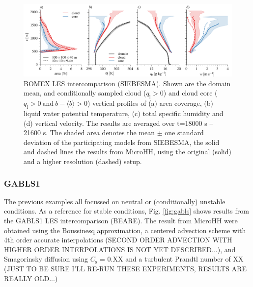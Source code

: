 \documentclass[gmd]{copernicus}
\begin{document}
\begin{figure}[t]
\vspace*{2mm}
\begin{center}
\includegraphics[width=16.6cm]{figs/gmd_bomex_profs.pdf}
\end{center}
\caption{BOMEX LES intercomparison (SIEBESMA). Shown are the domain mean, and conditionally sampled cloud ($q_\mathrm{l} > 0$) and cloud core ($q_\mathrm{l}>0 \ \mathrm{and} \ b-\langle b \rangle > 0$) vertical profiles of (a) area coverage, (b) liquid water potential temperature, (c) total specific humidity and (d) vertical velocity. The results are averaged over t=18000 s -- 21600 s. The shaded area denotes the mean $\pm$ one standard deviation of the participating models from SIEBESMA, the solid and dashed lines the results from MicroHH, using the original (solid) and a higher resolution (dashed) setup.}
\label{fig:bomex}
\end{figure}

\subsubsection{GABLS1}

The previous examples all focussed on neutral or (conditionally) unstable conditions. As a reference for stable conditions, Fig. \ref{fig:gabls} shows results from the GABLS1 LES intercomparison (BEARE). The result from MicroHH were obtained using the Boussinesq approximation, a centered advection scheme with 4th order accurate interpolations (SECOND ORDER ADVECTION WITH HIGHER ORDER INTERPOLATIONS IS NOT YET DESCRIBED...), and Smagorinsky diffusion using $C_\mathrm{s}$ = 0.XX and a turbulent Prandtl number of XX (JUST TO BE SURE I'LL RE-RUN THESE EXPERIMENTS, RESULTS ARE REALLY OLD...)
\end{document}
